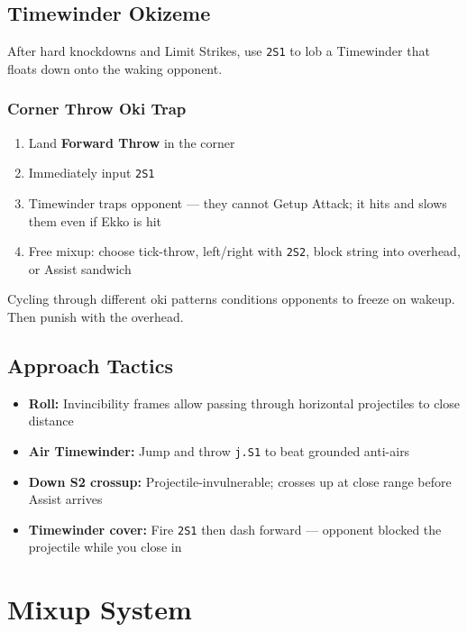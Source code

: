 \documentclass[12pt, a4paper]{report}
\newcommand{\notation}[1]{{\small\texttt{\textcolor{ekkoBlue}{#1}}}}
\newcommand{\movename}[1]{\textbf{\textcolor{ekkoGold}{#1}}}
\begin{document}
\section{Timewinder Okizeme}

After hard knockdowns and Limit Strikes, use \notation{2S1} to lob a Timewinder that floats down onto the waking opponent.

\subsection{Corner Throw Oki Trap}
\begin{enumerate}
  \item Land \movename{Forward Throw} in the corner
  \item Immediately input \notation{2S1}
  \item Timewinder traps opponent --- they cannot Getup Attack; it hits and slows them even if Ekko is hit
  \item Free mixup: choose tick-throw, left/right with \notation{2S2}, block string into overhead, or Assist sandwich
\end{enumerate}

\begin{tipbox}
Cycling through different oki patterns conditions opponents to freeze on wakeup. Then punish with the overhead.
\end{tipbox}

\section{Approach Tactics}

\begin{itemize}
  \item \textbf{Roll:} Invincibility frames allow passing through horizontal projectiles to close distance
  \item \textbf{Air Timewinder:} Jump and throw \notation{j.S1} to beat grounded anti-airs
  \item \textbf{Down S2 crossup:} Projectile-invulnerable; crosses up at close range before Assist arrives
  \item \textbf{Timewinder cover:} Fire \notation{2S1} then dash forward --- opponent blocked the projectile while you close in
\end{itemize}

\chapter{Mixup System}
\end{document}

